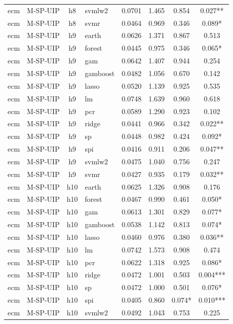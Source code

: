 \begin{ThreePartTable}
\begin{longtable}[t]{llclcccc}
ecm & M-SP-UIP & h8 & svmlw2 & 0.0701 & 1.465 & 0.854 & 0.027**\\
ecm & M-SP-UIP & h8 & svmr & 0.0464 & 0.969 & 0.346 & 0.089*\\
\addlinespace
ecm & M-SP-UIP & h9 & earth & 0.0626 & 1.371 & 0.867 & 0.513\\
ecm & M-SP-UIP & h9 & forest & 0.0445 & 0.975 & 0.346 & 0.065*\\
ecm & M-SP-UIP & h9 & gam & 0.0642 & 1.407 & 0.944 & 0.254\\
ecm & M-SP-UIP & h9 & gamboost & 0.0482 & 1.056 & 0.670 & 0.142\\
ecm & M-SP-UIP & h9 & lasso & 0.0520 & 1.139 & 0.925 & 0.535\\
ecm & M-SP-UIP & h9 & lm & 0.0748 & 1.639 & 0.960 & 0.618\\
ecm & M-SP-UIP & h9 & pcr & 0.0589 & 1.290 & 0.923 & 0.102\\
ecm & M-SP-UIP & h9 & ridge & 0.0441 & 0.966 & 0.342 & 0.022**\\
ecm & M-SP-UIP & h9 & sp & 0.0448 & 0.982 & 0.424 & 0.092*\\
ecm & M-SP-UIP & h9 & spi & 0.0416 & 0.911 & 0.206 & 0.047**\\
ecm & M-SP-UIP & h9 & svmlw2 & 0.0475 & 1.040 & 0.756 & 0.247\\
ecm & M-SP-UIP & h9 & svmr & 0.0427 & 0.935 & 0.179 & 0.032**\\
\addlinespace
ecm & M-SP-UIP & h10 & earth & 0.0625 & 1.326 & 0.908 & 0.176\\
ecm & M-SP-UIP & h10 & forest & 0.0467 & 0.990 & 0.461 & 0.050*\\
ecm & M-SP-UIP & h10 & gam & 0.0613 & 1.301 & 0.829 & 0.077*\\
ecm & M-SP-UIP & h10 & gamboost & 0.0538 & 1.142 & 0.813 & 0.074*\\
ecm & M-SP-UIP & h10 & lasso & 0.0460 & 0.976 & 0.380 & 0.036**\\
ecm & M-SP-UIP & h10 & lm & 0.0742 & 1.573 & 0.908 & 0.474\\
ecm & M-SP-UIP & h10 & pcr & 0.0622 & 1.318 & 0.925 & 0.086*\\
ecm & M-SP-UIP & h10 & ridge & 0.0472 & 1.001 & 0.503 & 0.004***\\
ecm & M-SP-UIP & h10 & sp & 0.0472 & 1.000 & 0.501 & 0.076*\\
ecm & M-SP-UIP & h10 & spi & 0.0405 & 0.860 & 0.074* & 0.010***\\
ecm & M-SP-UIP & h10 & svmlw2 & 0.0492 & 1.043 & 0.753 & 0.225\\

\end{longtable}
\end{ThreePartTable}
